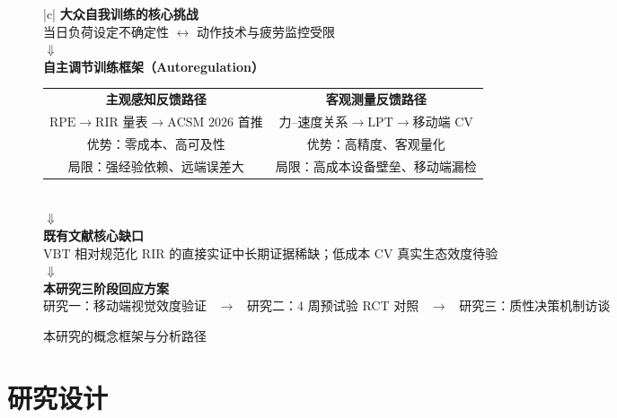 \documentclass[UTF8,zihao=-4,twoside,openany]{ctexbook}
\begin{document}
\begin{figure}[htbp]
  \centering
  \small
  \begin{tabular}{|c|}
    \hline
    \textbf{大众自我训练的核心挑战} \\
    当日负荷设定不确定性 \quad $\longleftrightarrow$ \quad 动作技术与疲劳监控受限 \\
    $\Downarrow$ \\
    \textbf{自主调节训练框架（Autoregulation）} \\
    \begin{tabular}{c@{\hspace{2.5cm}}c}
      \textbf{主观感知反馈路径} & \textbf{客观测量反馈路径} \\
      $\text{RPE} \longrightarrow \text{RIR 量表} \longrightarrow \text{ACSM 2026 首推}$ & $\text{力--速度关系} \longrightarrow \text{LPT} \longrightarrow \text{移动端 CV}$ \\
      优势：零成本、高可及性 & 优势：高精度、客观量化 \\
      局限：强经验依赖、远端误差大 & 局限：高成本设备壁垒、移动端漏检 \\
    \end{tabular} \\
    $\Downarrow$ \\
    \textbf{既有文献核心缺口} \\
    $\text{VBT}$ 相对规范化 $\text{RIR}$ 的直接实证中长期证据稀缺；低成本 $\text{CV}$ 真实生态效度待验 \\
    $\Downarrow$ \\
    \textbf{本研究三阶段回应方案} \\
    研究一：移动端视觉效度验证 \ $\longrightarrow$ \ 研究二：4 周预试验 RCT 对照 \ $\longrightarrow$ \ 研究三：质性决策机制访谈 \\
    \hline
  \end{tabular}
  \vspace{6pt}
  \caption{本研究的概念框架与分析路径}
  \label{fig:ch2-framework}
\end{figure}

\clearpage
\chapter{研究设计}
\end{document}
